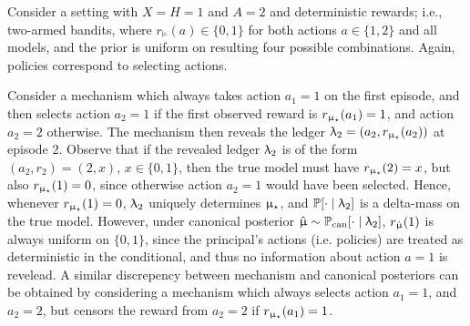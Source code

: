 \begin{example} Consider a setting with $X = H = 1$ and $A = 2$ and deterministic rewards; i.e., two-armed bandits, where $r_{\models}(a) \in \{0,1\}$ for both actions $a \in \{1,2\}$ and all models, and the prior is uniform on resulting four possible combinations. Again, policies correspond to selecting actions.

Consider a mechanism which always takes action $a_1 = 1$ on the first episode, and then selects action $a_2 = 1$ if the first observed reward is $r_{\upmu_{\star}}(a_1) = 1$, and action $a_2 = 2$ otherwise. The mechanism then reveals the ledger $\uplambda_2 = (a_2, r_{\upmu_{\star}}(a_2))$ at episode $2$. Observe that if the revealed ledger $\uplambda_2$ is of the form  $(a_2,r_2) = (2,x)$, $x \in \{0,1\}$, then the true model must have $r_{\upmu_{\star}}(2) = x$, but also $r_{\upmu_{\star}}(1) = 0$, since otherwise action $a_2 = 1$ would have been selected. Hence, whenever $r_{\upmu_{\star}}(1) = 0$, $\uplambda_2$ uniquely determines $\upmu_{\star}$, and  $\operatorname{\mathbb{P}}[ \cdot \mid \uplambda_2]$ is a delta-mass on the true model. However, under canonical posterior $\hat{\upmu} \sim \operatorname{\mathbb{P}}_{\mathrm{can}}[\cdot\mid \uplambda_2]$, $r_{\hat{\upmu}}(1)$ is always uniform on $\{0,1\}$, since the principal's actions (i.e. policies) are treated as deterministic in the conditional, and thus no information about action $a = 1$ is revelead. A similar discrepency between mechanism and canonical posteriors can be obtained by considering a mechanism which always selects action $a_1 = 1$, and $a_2 = 2$, but censors the reward from $a_2 = 2$ if $r_{\upmu_{\star}}(a_1) = 1$.
\end{example} 